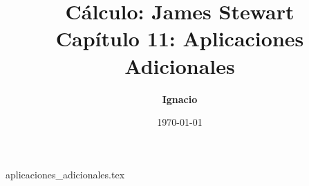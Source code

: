 \documentclass[11pt,spanish,oneside]{report}
\title{\textbf{Cálculo: James Stewart} \\ \Large Capítulo 11: Aplicaciones Adicionales}
\author{\textbf{Ignacio}}
\date{\today}
\begin{document}
\maketitle

{aplicaciones_adicionales.tex}
\end{document}
